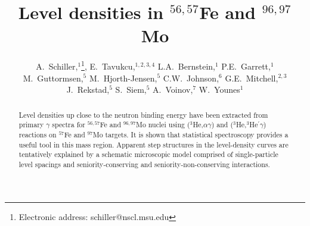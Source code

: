 \draft



\title{Level densities in $^{56,57}$Fe and $^{96,97}$Mo}
\author{A.~Schiller,$^{1}$\footnote{Electronic address: 
schiller@nscl.msu.edu}, E.~Tavukcu,$^{1,2,3,4}$ L.A.~Bernstein,$^1$ 
P.E.~Garrett,$^1$ M.~Guttormsen,$^5$ M.~Hjorth-Jensen,$^5$ C.W.~Johnson,$^6$ 
G.E.~Mitchell,$^{2,3}$ J.~Rekstad,$^5$ S.~Siem,$^5$ A.~Voinov,$^7$ 
W.~Younes$^1$}
\address{$^1$ Lawrence Livermore National Laboratory, L-414, 7000 East Avenue, 
Livermore, California 94551, USA}
\address{$^2$ North Carolina State University, Raleigh, North Carolina 27695, 
USA}
\address{$^3$ Triangle Universities Nuclear Laboratory, Durham, North Carolina 
27708, USA}
\address{$^4$ Department of Physics, Osmangazi University, Meselik, Eskisehir, 
26480 Turkey}
\address{$^5$ Department of Physics, University of Oslo, N-0316 Oslo, Norway}
\address{$^6$ San Diego State University, San Diego, California 92182, USA}
\address{$^7$ Frank Laboratory of Neutron Physics, Joint Institute of Nuclear 
Research, 141980 Dubna, Moscow region, Russia}

\maketitle

\begin{abstract}
Level densities up close to the neutron binding energy have been extracted from
primary $\gamma$ spectra for $^{56,57}$Fe and $^{96,97}$Mo nuclei using 
($^3$He,$\alpha\gamma$) and ($^3$He,$^3$He$^\prime\gamma$) reactions on 
$^{57}$Fe and $^{97}$Mo targets. It is shown that statistical spectroscopy 
provides a useful tool in this mass region. Apparent step structures in the 
level-density curves are tentatively explained by a schematic microscopic model
comprised of single-particle level spacings and seniority-conserving and 
seniority-non-conserving interactions.
\end{abstract}


